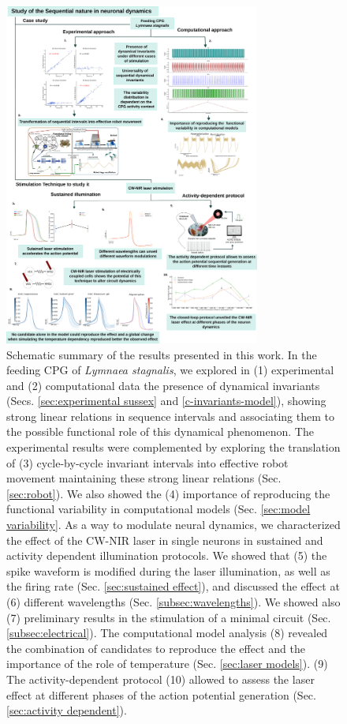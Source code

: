 \begin{figure}[htb!]
	\centering
	\includegraphics[width=0.75\textwidth]{img/panel_discussion_vertical_figures.pdf}
	\caption{Schematic summary of the results presented in this work. In the feeding CPG of \textit{Lymnaea stagnalis}, we explored in (1) experimental and (2) computational data the presence of dynamical invariants (Secs. \ref{sec:experimental sussex} and \ref{c-invariants-model}), showing strong linear relations in sequence intervals and associating them to the possible functional role of this dynamical phenomenon. The experimental results were complemented by exploring the translation of (3) cycle-by-cycle invariant intervals into effective robot movement maintaining these strong linear relations (Sec. \ref{sec:robot}). We also showed the (4) importance of reproducing the functional variability in computational models (Sec. \ref{sec:model variability}. As a way to modulate neural dynamics, we characterized the effect of the CW-NIR laser in single neurons in sustained and activity dependent illumination protocols. We showed that (5) the spike waveform is modified during the laser illumination, as well as the firing rate (Sec. \ref{sec:sustained effect}), and discussed the effect at (6) different wavelengths (Sec. \ref{subsec:wavelengths}). We showed also (7) preliminary results in the stimulation of a minimal circuit (Sec. \ref{subsec:electrical}). The computational model analysis (8) revealed the combination of candidates to reproduce the effect and the importance of the role of  temperature (Sec. \ref{sec:laser models}). (9) The activity-dependent protocol (10) allowed to assess the laser effect at different phases of the action potential generation (Sec. \ref{sec:activity dependent}).}
	\label{fig:discussion summary}
\end{figure}

